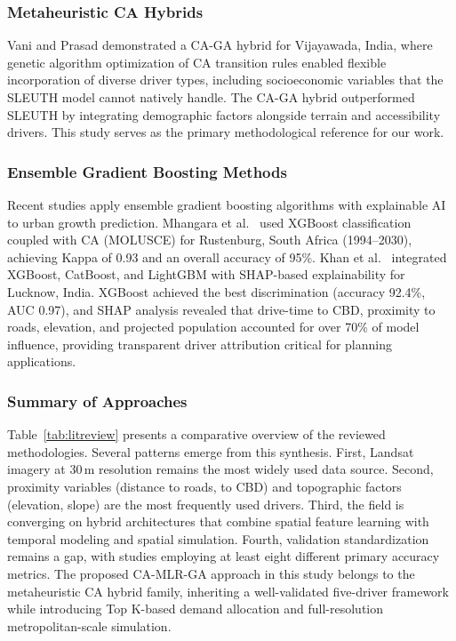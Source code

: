 \documentclass[12pt,a4paper]{article}
\begin{document}
\subsubsection{Metaheuristic CA Hybrids}
Vani and Prasad \cite{vani2022} demonstrated a CA-GA hybrid for Vijayawada, India, where genetic algorithm optimization of CA transition rules enabled flexible incorporation of diverse driver types, including socioeconomic variables that the SLEUTH model cannot natively handle. The CA-GA hybrid outperformed SLEUTH by integrating demographic factors alongside terrain and accessibility drivers. This study serves as the primary methodological reference for our work.

\subsubsection{Ensemble Gradient Boosting Methods}
Recent studies apply ensemble gradient boosting algorithms with explainable AI to urban growth prediction. Mhangara et al.\ \cite{mhangara2025} used XGBoost classification coupled with CA (MOLUSCE) for Rustenburg, South Africa (1994--2030), achieving Kappa of 0.93 and an overall accuracy of 95\%. Khan et al.\ \cite{khan2025} integrated XGBoost, CatBoost, and LightGBM with SHAP-based explainability for Lucknow, India. XGBoost achieved the best discrimination (accuracy 92.4\%, AUC 0.97), and SHAP analysis revealed that drive-time to CBD, proximity to roads, elevation, and projected population accounted for over 70\% of model influence, providing transparent driver attribution critical for planning applications.

\subsubsection{Summary of Approaches}
Table~\ref{tab:litreview} presents a comparative overview of the reviewed methodologies. Several patterns emerge from this synthesis. First, Landsat imagery at 30\,m resolution remains the most widely used data source. Second, proximity variables (distance to roads, to CBD) and topographic factors (elevation, slope) are the most frequently used drivers. Third, the field is converging on hybrid architectures that combine spatial feature learning with temporal modeling and spatial simulation. Fourth, validation standardization remains a gap, with studies employing at least eight different primary accuracy metrics. The proposed CA-MLR-GA approach in this study belongs to the metaheuristic CA hybrid family, inheriting a well-validated five-driver framework while introducing Top K-based demand allocation and full-resolution metropolitan-scale simulation.
\end{document}

